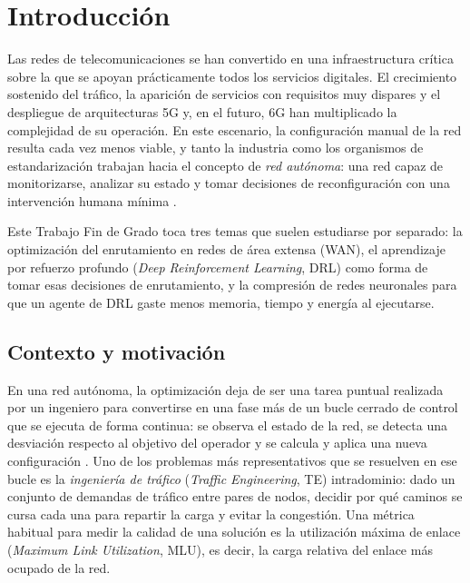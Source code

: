 \chapter{Introducción}\label{cap:int}

Las redes de telecomunicaciones se han convertido en una infraestructura crítica sobre la que se apoyan prácticamente todos los servicios digitales. El crecimiento sostenido del tráfico, la aparición de servicios con requisitos muy dispares y el despliegue de arquitecturas 5G y, en el futuro, 6G han multiplicado la complejidad de su operación. En este escenario, la configuración manual de la red resulta cada vez menos viable, y tanto la industria como los organismos de estandarización trabajan hacia el concepto de \textit{red autónoma}: una red capaz de monitorizarse, analizar su estado y tomar decisiones de reconfiguración con una intervención humana mínima \cite{coronado2022zero,etsi_zsm011}.

Este Trabajo Fin de Grado toca tres temas que suelen estudiarse por separado: la optimización del enrutamiento en redes de área extensa (WAN), el aprendizaje por refuerzo profundo (\textit{Deep Reinforcement Learning}, DRL) como forma de tomar esas decisiones de enrutamiento, y la compresión de redes neuronales para que un agente de DRL gaste menos memoria, tiempo y energía al ejecutarse.

\section{Contexto y motivación}\label{sec:int_motivacion}

En una red autónoma, la optimización deja de ser una tarea puntual realizada por un ingeniero para convertirse en una fase más de un bucle cerrado de control que se ejecuta de forma continua: se observa el estado de la red, se detecta una desviación respecto al objetivo del operador y se calcula y aplica una nueva configuración \cite{etsi_zsm016}. Uno de los problemas más representativos que se resuelven en ese bucle es la \textit{ingeniería de tráfico} (\textit{Traffic Engineering}, TE) intradominio: dado un conjunto de demandas de tráfico entre pares de nodos, decidir por qué caminos se cursa cada una para repartir la carga y evitar la congestión. Una métrica habitual para medir la calidad de una solución es la utilización máxima de enlace (\textit{Maximum Link Utilization}, MLU), es decir, la carga relativa del enlace más ocupado de la red.

